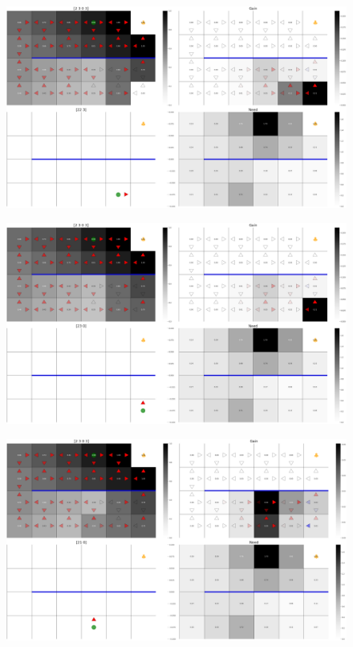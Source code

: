 \documentclass{article}
\begin{document}
\begin{figure}[ht!]
    \centering
    \includegraphics[width=1\textwidth]{../data/plots/move_3001_2.png}
\end{figure}
\begin{figure}[ht!]
    \centering
    \includegraphics[width=1\textwidth]{../data/plots/move_3001_3.png}
\end{figure}
\begin{figure}[ht!]
    \centering
    \includegraphics[width=1\textwidth]{../data/plots/move_3001_4.png}
\end{figure}
\end{document}
